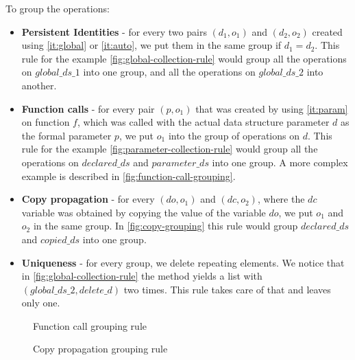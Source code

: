 \documentclass[a4paper,11pt]{article}
\begin{document}
		To group the operations:
		\begin{itemize}

            \item \textbf{Persistent Identities} - for every two pairs $(d_1, o_1)$ and $(d_2, o_2)$ created using
                \autoref{it:global} or \autoref{it:auto}, we put them in the same group if $d_1 = d_2$. This rule for the example \autoref{fig:global-collection-rule} would group all the operations on $global\_ds\_1$ into one group, and all the operations on $global\_ds\_2$ into another.

            \item \textbf{Function calls} - for every pair $(p, o_1)$ that was created by using \autoref{it:param}
                on function $f$, which was called with the actual data structure parameter $d$ as the formal parameter
                $p$, we put $o_1$ into the group of operations on $d$.
                This rule for the example \autoref{fig:parameter-collection-rule} would group all the operations on $declared\_ds$ and $parameter\_ds$ into one group. A more complex example is described in \autoref{fig:function-call-grouping}.

            \item \textbf{Copy propagation} - for every $(do, o_1)$ and $(dc, o_2)$, where the $dc$ variable was
                obtained by copying the value of the variable $do$, we put $o_1$ and $o_2$ in the same group. In \autoref{fig:copy-grouping} this rule would group 
                $declared\_ds$ and $copied\_ds$ into one group.

            \item \textbf{Uniqueness} - for every group, we delete repeating elements. We notice that in \autoref{fig:global-collection-rule} the method yields a list with $(global\_ds\_2, delete\_d)$ two times. This rule takes care of that and leaves only one.

		\end{itemize}

        \begin{figure}[h]
            

            \caption{Function call grouping rule}

            \label{fig:function-call-grouping}
        \end{figure}


        \begin{figure}[h]
            

            \caption{Copy propagation grouping rule}

            \label{fig:copy-grouping}
        \end{figure}
\end{document}
